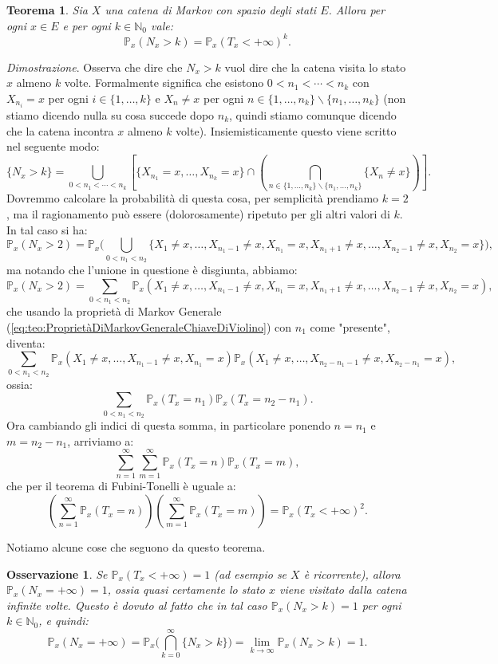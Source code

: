 \documentclass[11pt]{book}
\makeatletter
\theoremstyle{Definizione}
\theoremstyle{TeoremaProposizioneLemmaCorollario}
\newtheorem{myteo}{Teorema}[section]
\theoremstyle{OsservazioneNota}
\newtheorem{myobs}{Osservazione}[section]
\renewenvironment{proof}[1][\proofname]{\par
  \normalfont \topsep6\p@\@plus6\p@\relax
  \trivlist
  \item[\hskip\labelsep
        \itshape
    #1\@addpunct{.}]\ignorespaces
}{%
  \endtrivlist\@endpefalse
}
\newcommand{\N}{\mathbb{N}}
\newcommand{\tolto}{\smallsetminus}
\renewcommand{\P}{\mathbb{P}}
\renewenvironment{proof}{\textsl{Dimostrazione}.}{}
\makeatother
\begin{document}
\begin{boxteo}{}
\begin{myteo}
Sia $X$ una catena di Markov con spazio degli stati $E$. Allora per ogni $x\in E$ e per ogni $k\in \N_0$ vale:
$$
\P_x(N_x > k) = \P_x(T_x < +\infty)^k.
$$
\end{myteo}
\tcblower
\begin{proof}
Osserva che dire che $N_x > k$ vuol dire che la catena visita lo stato $x$ almeno $k$ volte. Formalmente significa che esistono $0<n_1<\cdots<n_k$ con $X_{n_i} = x$ per ogni $i\in \{1,\dots,k\}$ e $X_n \neq x$ per ogni $n\in \{1,\dots,n_k\}\tolto \{n_1,\dots,n_k\}$ (non stiamo dicendo nulla su cosa succede dopo $n_k$, quindi stiamo comunque dicendo che la catena incontra $x$ almeno $k$ volte). Insiemisticamente questo viene scritto nel seguente modo:
$$
\{N_x > k\} = \bigcup_{0< n_1 < \cdots <n_k} \left[\{X_{n_1} = x,\dots,X_{n_k} = x\}\cap \left(\bigcap_{n\in \{1,\dots,n_k\}\tolto \{n_1,\dots,n_k\}} \{X_n \neq x\}\right)\right].
$$
Dovremmo calcolare la probabilità di questa cosa, per semplicità prendiamo $k = 2$, ma il ragionamento può essere (dolorosamente) ripetuto per gli altri valori di $k$. In tal caso si ha:
$$
\P_x(N_x > 2) = \P_x \Bigg(\bigcup_{0 < n_1 < n_2}\{X_1 \neq x,\dots,X_{n_1-1}\neq x,X_{n_1} = x,X_{n_1+1}\neq x,\dots,X_{n_2-1}\neq x,X_{n_2} = x\}\Bigg),
$$
ma notando che l'unione in questione è disgiunta, abbiamo:
$$
\P_x(N_x > 2) = \sum_{0 < n_1 < n_2} \P_x(X_1 \neq x,\dots,X_{n_1-1}\neq x,X_{n_1} = x,X_{n_1+1}\neq x,\dots,X_{n_2-1}\neq x,X_{n_2} = x),
$$
che usando la proprietà di Markov Generale (\ref{eq:teo:ProprietàDiMarkovGeneraleChiaveDiViolino}) con $n_1$ come "presente", diventa:
$$
\sum_{0 < n_1 < n_2} \P_x(X_1 \neq x,\dots, X_{n_1-1}\neq x, X_{n_1} =x) \P_x(X_1\neq x,\dots,X_{n_2-n_1-1} \neq x,X_{n_2-n_1} = x),
$$
ossia:
$$
\sum_{0 < n_1 < n_2} \P_x(T_x = n_1) \P_x(T_x = n_2-n_1).
$$
Ora cambiando gli indici di questa somma, in particolare ponendo $n = n_1$ e $m = n_2-n_1$, arriviamo a:
$$
\sum_{n = 1}^\infty\sum_{m = 1}^\infty \P_x(T_x = n) \P_x(T_x = m),
$$
che per il teorema di Fubini-Tonelli è uguale a:
$$
\left(\sum_{n = 1}^\infty \P_x(T_x = n)\right)\left(\sum_{m = 1}^\infty \P_x(T_x = m)\right) = \P_x(T_x <+\infty)^2.
$$
\end{proof}
\end{boxteo}
\noindent
Notiamo alcune cose che seguono da questo teorema.
\begin{myobs}
Se $\P_x(T_x < +\infty) = 1$ (ad esempio se $X$ è ricorrente), allora$\P_x(N_x = +\infty) = 1$, ossia quasi certamente lo stato $x$ viene visitato dalla catena infinite volte. Questo è dovuto al fatto che in tal caso $\P_x(N_x > k) = 1$ per ogni $k\in \N_0$, e quindi:
$$
\P_x(N_x = +\infty) = \P_x\Bigg(\bigcap_{k = 0}^\infty \{N_x > k\}\Bigg) = \lim_{k \to \infty} \P_x(N_x > k) = 1.
$$
\end{myobs}
\end{document}
